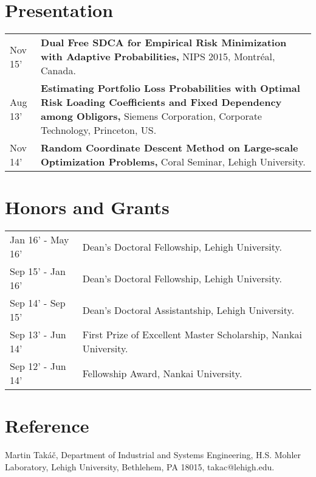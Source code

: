 \documentclass[a4paper,11pt]{article} %
\begin{document}
\section{Presentation}
\begin{longtable}{>{\centering}p{3.3cm}|p{14cm}}
    Nov 15' &\textbf{Dual Free SDCA for Empirical Risk Minimization with Adaptive Probabilities,} NIPS 2015, Montréal, Canada.  \\
    Aug 13' &\textbf{Estimating Portfolio Loss Probabilities with Optimal Risk Loading Coefficients and Fixed Dependency among Obligors,} Siemens Corporation, Corporate Technology, Princeton, US.\\
    Nov 14' &\textbf{Random Coordinate Descent Method on Large-scale Optimization Problems,} Coral Seminar, Lehigh University.
\end{longtable}

\section{Honors and Grants}
\begin{longtable}{>{\centering}p{3.3cm}|p{14cm}}
   Jan 16' - May 16' & Dean’s Doctoral Fellowship, Lehigh University.\\
   Sep 15' - Jan 16' & Dean’s Doctoral Fellowship, Lehigh University.\\
   Sep 14' - Sep 15' & Dean’s Doctoral Assistantship, Lehigh University.\\
   Sep 13' - Jun 14' & First Prize of Excellent Master Scholarship, Nankai University.\\
   Sep 12' - Jun 14' & Fellowship Award, Nankai University.\\
\end{longtable}


\section{Reference}
Martin Takáč, Department of Industrial and Systems Engineering, H.S. Mohler Laboratory, Lehigh University, Bethlehem, PA 18015, takac@lehigh.edu.
\end{document}
